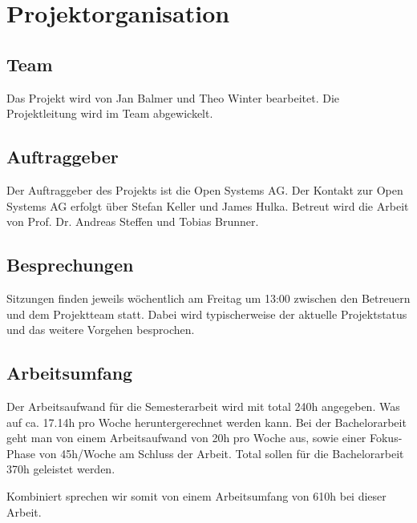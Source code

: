 \section{Projektorganisation}
\label{sec:Projektorganisation}

\subsection{Team}
Das Projekt wird von Jan Balmer und Theo Winter bearbeitet. Die Projektleitung wird im Team abgewickelt.

\subsection{Auftraggeber}
Der Auftraggeber des Projekts ist die Open Systems AG. Der Kontakt zur Open Systems AG erfolgt über Stefan Keller und James Hulka. Betreut wird die Arbeit von Prof. Dr. Andreas Steffen und Tobias Brunner.

\subsection{Besprechungen}
Sitzungen finden jeweils wöchentlich am Freitag um 13:00 zwischen den Betreuern und dem Projektteam statt. Dabei wird typischerweise der aktuelle Projektstatus und das weitere Vorgehen besprochen.

\subsection{Arbeitsumfang}
Der Arbeitsaufwand für die Semesterarbeit wird mit total 240h angegeben. Was auf ca. 17.14h pro Woche heruntergerechnet werden kann.
Bei der Bachelorarbeit geht man von einem Arbeitsaufwand von 20h pro Woche aus, sowie einer Fokus-Phase von 45h/Woche am Schluss der Arbeit. Total sollen für die Bachelorarbeit 370h geleistet werden.

Kombiniert sprechen wir somit von einem Arbeitsumfang von 610h bei dieser Arbeit.